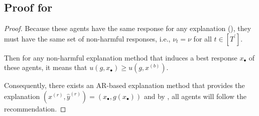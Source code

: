 \subsection{Proof for }
\begin{proof}[Proof]
Because these agents have the same response for any explanation (), they must have the same set of non-harmful responses, i.e., $\nu_t=\nu$ for all $t\in[T^\prime]$.

Then for any non-harmful explanation method that induces a best response $x_\bullet$ of these agents, it means that $u(g,x_\bullet)\geq u(g,x^{(b)})$.

Consequently, there exists an AR-based explanation method that provides the explanation $(x^{(r)},\hat{y}^{(r)})=(x_\bullet,g(x_\bullet))$ and by , all agents will follow the recommendation.
\end{proof}






